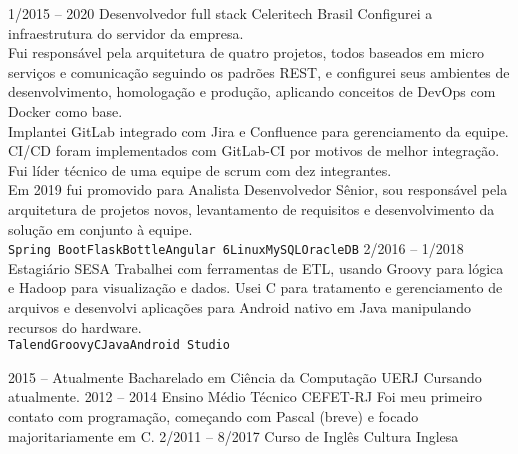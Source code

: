 \documentclass[9pt]{developercv} %
\begin{document}
\begin{entrylist}
  \entry
    {1/2015 -- 2020}
    {Desenvolvedor full stack}
    {Celeritech Brasil}
    {Configurei a infraestrutura do servidor da empresa.\\Fui responsável pela arquitetura de quatro projetos, todos baseados em micro serviços e comunicação seguindo os padrões REST, e configurei seus ambientes de desenvolvimento, homologação e produção, aplicando conceitos de DevOps com Docker como base.\\Implantei GitLab integrado com Jira e Confluence para gerenciamento da equipe.\\CI/CD foram implementados com GitLab-CI por motivos de melhor integração.\\Fui líder técnico de uma equipe de scrum com dez integrantes.\\Em 2019 fui promovido para Analista Desenvolvedor Sênior, sou responsável pela arquitetura de projetos novos, levantamento de requisitos e desenvolvimento da solução em conjunto à equipe.\\ \texttt{Spring Boot}\slashsep\texttt{Flask}\slashsep\texttt{Bottle}\slashsep\texttt{Angular 6}\slashsep\texttt{Linux}\slashsep\texttt{MySQL}\slashsep\texttt{OracleDB}}
  \entry
    {2/2016 -- 1/2018}
    {Estagiário}
    {SESA}
    {Trabalhei com ferramentas de ETL, usando Groovy para lógica e Hadoop para visualização e dados. Usei C para tratamento e gerenciamento de arquivos e desenvolvi aplicações para Android nativo em Java manipulando recursos do hardware.\\ \texttt{Talend}\slashsep\texttt{Groovy}\slashsep\texttt{C}\slashsep\texttt{Java}\slashsep\texttt{Android Studio}}
\end{entrylist}



\begin{entrylist}
  \entry
    {2015 -- Atualmente}
    {Bacharelado em Ciência da Computação}
    {UERJ}
    {Cursando atualmente.}
  \entry
    {2012 -- 2014}
    {Ensino Médio Técnico}
    {CEFET-RJ}
    {Foi meu primeiro contato com programação, começando com Pascal (breve) e focado majoritariamente em C.}
  \entry
    {2/2011 -- 8/2017}
    {Curso de Inglês}
    {Cultura Inglesa}
    {}
\end{entrylist}
\end{document}
